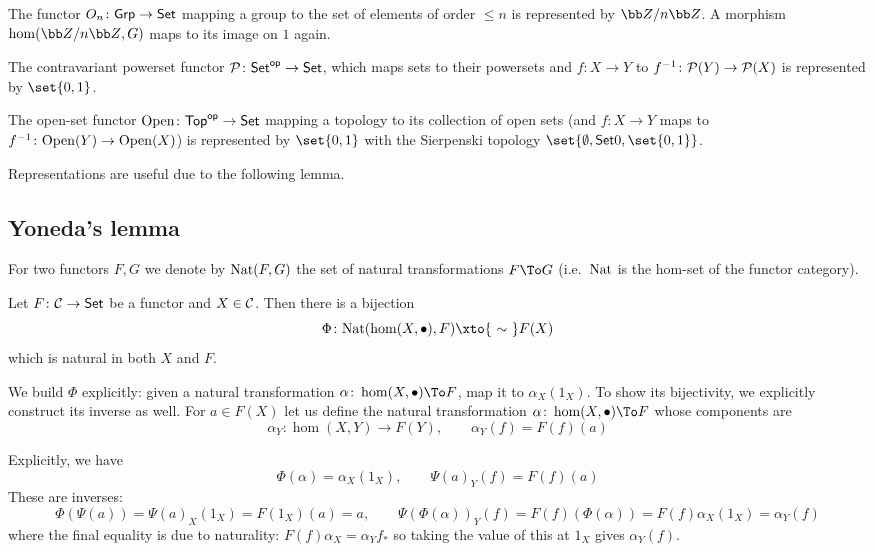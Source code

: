         \item The functor $O_n\colon{\sf Grp}\to{\sf Set}$ mapping a group to the set of elements of order $\leq n$ is represented by $\bZ/n\bZ$.
        A morphism $\hom(\bZ/n\bZ,G)$ maps to its image on $1$ again.

        \item The contravariant powerset functor ${\cal P}\colon{\sf Set}^{\sf op}\to{\sf Set}$, which maps sets to their powersets and $f\colon X\to Y$ to $f^{-1}\colon{\cal P}(Y)\to{\cal P}(X)$
        is represented by $\set{0,1}$.

        \item The open-set functor ${\rm Open}\colon{\sf Top}^{\sf op}\to{\sf Set}$ mapping a topology to its collection of open sets (and $f\colon X\to Y$ maps to $f^{-1}\colon{\rm Open}(Y)\to{\rm Open}(X)$)
        is represented by $\set{0,1}$ with the Sierpenski topology $\set{\emptyset,\Set0,\set{0,1}}$.
    \eenum

\eexam

Representations are useful due to the following lemma.

\subsection{Yoneda's lemma}

For two functors $F,G$ we denote by ${\rm Nat}(F,G)$ the set of natural transformations $F\To G$ (i.e.\ ${\rm Nat}$ is the hom-set of the functor category).

\bthrm[title=Yoneda's Lemma]

    Let $F\colon{{\cal C}}\to{\sf Set}$ be a functor and $X\in{{\cal C}}$.
    Then there is a bijection
    $$ \Phi\colon\nat(\hom(X,\bul),F) \xto{\ \sim\ } F(X) $$
    which is natural in both $X$ and $F$.

\ethrm

\bproof

    We build $\Phi$ explicitly: given a natural transformation $\alpha\colon\hom(X,\bul)\To F$, map it to $\alpha_X(1_X)$.
    To show its bijectivity, we explicitly construct its inverse as well.
    For $a\in F(X)$ let us define the natural transformation $\alpha\colon\hom(X,\bul)\To F$ whose components are
    $$ \alpha_Y\colon\hom(X,Y)\to F(Y),\qquad \alpha_Y(f) = F(f)(a) $$

    Explicitly, we have
    $$ \Phi(\alpha)=\alpha_X(1_X),\qquad \Psi(a)_Y(f) = F(f)(a) $$
    These are inverses:
    $$ \Phi(\Psi(a)) = \Psi(a)_X(1_X) = F(1_X)(a) = a,\qquad \Psi(\Phi(\alpha))_Y(f) = F(f)(\Phi(\alpha)) = F(f)\alpha_X(1_X) = \alpha_Y(f) $$
    where the final equality is due to naturality: $F(f)\alpha_X=\alpha_Yf_*$ so taking the value of this at $1_X$ gives $\alpha_Y(f)$.

